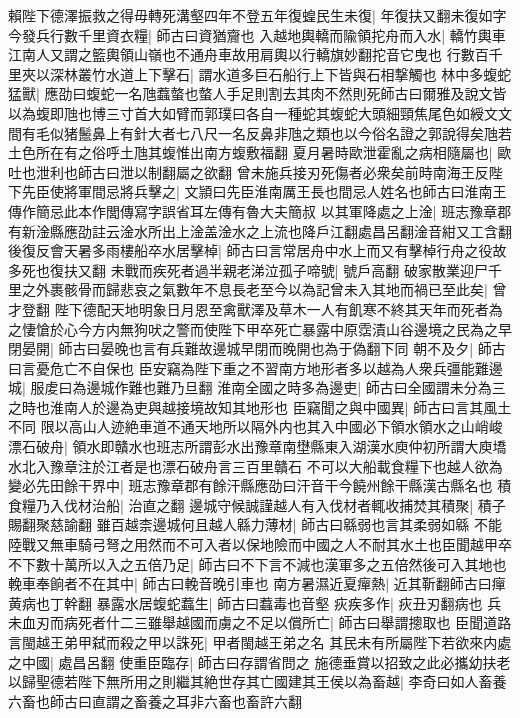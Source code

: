 賴陛下德澤振救之得毋轉死溝壑四年不登五年復蝗民生未復|{
	年復扶又翻未復如字}
今發兵行數千里資衣糧|{
	師古曰資猶齎也}
入越地輿轎而隃領拕舟而入水|{
	轎竹輿車江南人又謂之籃輿領山嶺也不通舟車故用肩輿以行轎旗妙翻拕音它曳也}
行數百千里夾以深林叢竹水道上下擊石|{
	謂水道多巨石船行上下皆與石相撃觸也}
林中多蝮蛇猛獸|{
	應劭曰蝮蛇一名虺蠚螫也螫人手足則割去其肉不然則死師古曰爾雅及說文皆以為蝮即虺也博三寸首大如臂而郭璞曰各自一種蛇其蝮蛇大頭細頸焦尾色如綬文文間有毛似猪鬛鼻上有針大者七八尺一名反鼻非虺之類也以今俗名證之郭說得矣虺若土色所在有之俗呼土虺其蝮惟出南方蝮敷福翻}
夏月暑時歐泄霍亂之病相隨屬也|{
	歐吐也泄利也師古曰泄以制翻屬之欲翻}
曾未施兵接刃死傷者必衆矣前時南海王反陛下先臣使將軍間忌將兵擊之|{
	文頴曰先臣淮南厲王長也間忌人姓名也師古曰淮南王傳作簡忌此本作閭傳寫字誤省耳左傳有魯大夫簡叔}
以其軍降處之上淦|{
	班志豫章郡有新淦縣應劭註云淦水所出上淦盖淦水之上流也降戶江翻處昌呂翻淦音紺又工含翻}
後復反會天暑多雨樓船卒水居擊棹|{
	師古曰言常居舟中水上而又有擊棹行舟之役故多死也復扶又翻}
未戰而疾死者過半親老涕泣孤子啼號|{
	號戶高翻}
破家散業迎尸千里之外裹骸骨而歸悲哀之氣數年不息長老至今以為記曾未入其地而禍已至此矣|{
	曾才登翻}
陛下德配天地明象日月恩至禽獸澤及草木一人有飢寒不終其天年而死者為之悽愴於心今方内無狗吠之警而使陛下甲卒死亡暴露中原霑漬山谷邊境之民為之早閉晏開|{
	師古曰晏晚也言有兵難故邊城早閉而晚開也為于偽翻下同}
朝不及夕|{
	師古曰言憂危亡不自保也}
臣安竊為陛下重之不習南方地形者多以越為人衆兵彊能難邊城|{
	服䖍曰為邊城作難也難乃旦翻}
淮南全國之時多為邊吏|{
	師古曰全國謂未分為三之時也淮南人於邊為吏與越接境故知其地形也}
臣竊聞之與中國異|{
	師古曰言其風土不同}
限以高山人迹絶車道不通天地所以隔外内也其入中國必下領水領水之山峭峻漂石破舟|{
	領水即贛水也班志所謂彭水出豫章南壄縣東入湖漢水庾仲初所謂大庾墧水北入豫章注於江者是也漂石破舟言三百里贛石}
不可以大船載食糧下也越人欲為變必先田餘干界中|{
	班志豫章郡有餘汗縣應劭曰汗音干今饒州餘干縣漢古縣名也}
積食糧乃入伐材治船|{
	治直之翻}
邊城守候誠謹越人有入伐材者輒收捕焚其積聚|{
	積子賜翻聚慈諭翻}
雖百越柰邊城何且越人緜力薄材|{
	師古曰緜弱也言其柔弱如緜}
不能陸戰又無車騎弓弩之用然而不可入者以保地險而中國之人不耐其水土也臣聞越甲卒不下數十萬所以入之五倍乃足|{
	師古曰不下言不減也漢軍多之五倍然後可入其地也}
輓車奉餉者不在其中|{
	師古曰輓音晚引車也}
南方暑濕近夏癉熱|{
	近其靳翻師古曰癉黄病也丁幹翻}
暴露水居蝮蛇蠚生|{
	師古曰蠚毒也音壑}
疢疾多作|{
	疢丑刃翻病也}
兵未血刃而病死者什二三雖舉越國而虜之不足以償所亡|{
	師古曰舉謂摠取也}
臣聞道路言閩越王弟甲弑而殺之甲以誅死|{
	甲者閩越王弟之名}
其民未有所屬陛下若欲來内處之中國|{
	處昌呂翻}
使重臣臨存|{
	師古曰存謂省問之}
施德垂賞以招致之此必攜幼扶老以歸聖德若陛下無所用之則繼其絶世存其亡國建其王侯以為畜越|{
	李奇曰如人畜養六畜也師古曰直謂之畜養之耳非六畜也畜許六翻}

